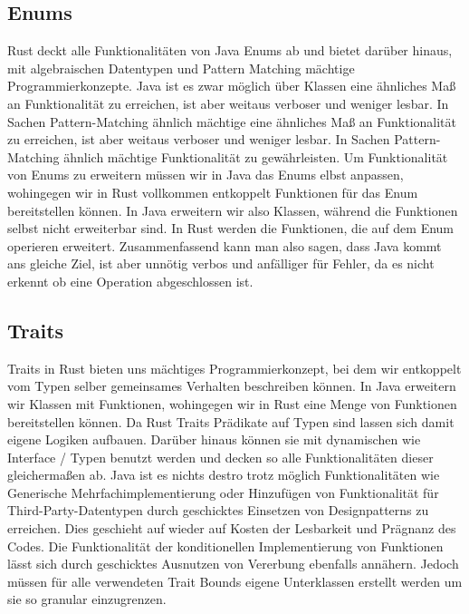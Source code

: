 \documentclass[a4paper, 1ppt]{article}
\begin{document}
\subsection{Enums}
Rust deckt alle Funktionalitäten von Java Enums ab und bietet darüber hinaus, mit algebraischen Datentypen und Pattern Matching mächtige Programmierkonzepte. Java ist es zwar möglich über Klassen eine ähnliches Maß an Funktionalität zu erreichen, ist aber weitaus verboser und weniger lesbar.
In Sachen Pattern-Matching ähnlich mächtige eine ähnliches Maß an Funktionalität zu erreichen, ist aber weitaus verboser und weniger lesbar.
In Sachen Pattern-Matching ähnlich mächtige Funktionalität zu gewährleisten.
Um Funktionalität von Enums zu erweitern müssen wir in Java das Enums elbst anpassen, wohingegen wir in Rust vollkommen entkoppelt Funktionen für das Enum bereitstellen können.
In Java erweitern wir also Klassen, während die Funktionen selbst nicht erweiterbar sind. In Rust werden die Funktionen, die auf dem Enum operieren erweitert.
Zusammenfassend kann man also sagen, dass Java kommt ans gleiche Ziel, ist aber unnötig verbos und anfälliger für Fehler, da es nicht erkennt ob eine Operation abgeschlossen ist. 

\subsection{Traits}
Traits in Rust bieten uns mächtiges Programmierkonzept, bei dem wir entkoppelt vom Typen selber gemeinsames Verhalten beschreiben können. In Java erweitern wir Klassen mit Funktionen, wohingegen wir in Rust eine Menge von Funktionen bereitstellen können.
Da Rust Traits Prädikate auf Typen sind lassen sich damit eigene Logiken aufbauen. Darüber hinaus können sie mit dynamischen wie Interface / Typen benutzt werden und decken so alle Funktionalitäten dieser gleichermaßen  ab. Java ist es nichts destro trotz möglich Funktionalitäten wie Generische Mehrfachimplementierung oder Hinzufügen von Funktionalität für Third-Party-Datentypen durch geschicktes Einsetzen von Designpatterns zu erreichen. Dies geschieht auf wieder auf Kosten der Lesbarkeit und Prägnanz des Codes. Die Funktionalität der konditionellen Implementierung von Funktionen lässt sich durch geschicktes Ausnutzen von Vererbung ebenfalls annähern. Jedoch müssen für alle verwendeten Trait Bounds eigene Unterklassen erstellt werden um sie so granular einzugrenzen. 



\end{document}
